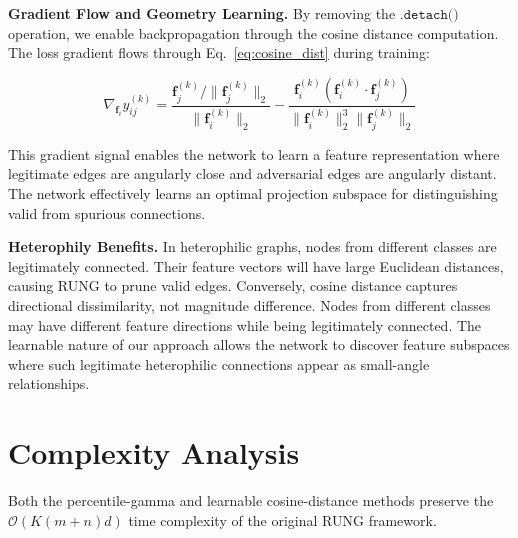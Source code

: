 \documentclass[sigconf]{acmart}
\begin{document}
\textbf{Gradient Flow and Geometry Learning.} By removing the $\texttt{.detach()}$ operation, we enable backpropagation through the cosine distance computation. The loss gradient flows through Eq.~\ref{eq:cosine_dist} during training:

$$\nabla_{\mathbf{f}_i} y^{(k)}_{ij} = \frac{\mathbf{f}^{(k)}_j/\|\mathbf{f}^{(k)}_j\|_2}{\|\mathbf{f}^{(k)}_i\|_2} - \frac{\mathbf{f}^{(k)}_i (\mathbf{f}^{(k)}_i \cdot \mathbf{f}^{(k)}_j)}{\|\mathbf{f}^{(k)}_i\|_2^3 \|\mathbf{f}^{(k)}_j\|_2}$$

This gradient signal enables the network to learn a feature representation where legitimate edges are angularly close and adversarial edges are angularly distant. The network effectively learns an optimal projection subspace for distinguishing valid from spurious connections.

\textbf{Heterophily Benefits.} In heterophilic graphs, nodes from different classes are legitimately connected. Their feature vectors will have large Euclidean distances, causing RUNG to prune valid edges. Conversely, cosine distance captures directional dissimilarity, not magnitude difference. Nodes from different classes may have different feature directions while being legitimately connected. The learnable nature of our approach allows the network to discover feature subspaces where such legitimate heterophilic connections appear as small-angle relationships.

\section{Complexity Analysis}\label{sec:complexity}
\begin{lemma}\label{lem:complexity}
Both the percentile-gamma and learnable cosine-distance methods preserve the $\mathcal{O}(K(m+n)d)$ time complexity of the original RUNG framework.
\end{lemma}
\end{document}
